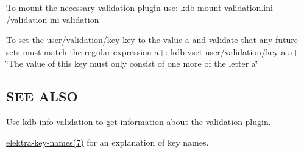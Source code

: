 To mount the necessary validation plugin use\+: {\ttfamily kdb mount validation.\+ini /validation ini validation}

To set the {\ttfamily user/validation/key} key to the value {\ttfamily a} and validate that any future sets must match the regular expression {\ttfamily a+}\+: {\ttfamily kdb vset user/validation/key a a+ \char`\"{}\+The value of this key must only consist of one more of the letter a\char`\"{}}

\subsection*{S\+EE A\+L\+SO}


\begin{DoxyItemize}
\item Use {\ttfamily kdb info validation} to get information about the validation plugin.
\item \hyperlink{md_doc_help_elektra-key-names_doc_help_elektra-key-names_md}{elektra-\/key-\/names(7)} for an explanation of key names. 
\end{DoxyItemize}